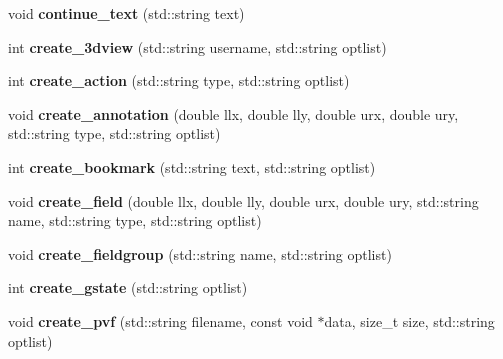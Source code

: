 \begin{DoxyCompactItemize}
\item 
\hypertarget{classPDFlib_a4ee3d13f4de6de4dd63f2430c2fb1ee2}{void {\bfseries continue\-\_\-text} (std\-::string text)}\label{classPDFlib_a4ee3d13f4de6de4dd63f2430c2fb1ee2}

\item 
\hypertarget{classPDFlib_ac3fb64cece3d7fbc0b5dd760e5ce490a}{int {\bfseries create\-\_\-3dview} (std\-::string username, std\-::string optlist)}\label{classPDFlib_ac3fb64cece3d7fbc0b5dd760e5ce490a}

\item 
\hypertarget{classPDFlib_abd882370ecf1a79ddf66c208817ab561}{int {\bfseries create\-\_\-action} (std\-::string type, std\-::string optlist)}\label{classPDFlib_abd882370ecf1a79ddf66c208817ab561}

\item 
\hypertarget{classPDFlib_af75e9080056e73d1aee1ad0277ac99eb}{void {\bfseries create\-\_\-annotation} (double llx, double lly, double urx, double ury, std\-::string type, std\-::string optlist)}\label{classPDFlib_af75e9080056e73d1aee1ad0277ac99eb}

\item 
\hypertarget{classPDFlib_a0ad6d073c261b0b69343fbc2aec77e61}{int {\bfseries create\-\_\-bookmark} (std\-::string text, std\-::string optlist)}\label{classPDFlib_a0ad6d073c261b0b69343fbc2aec77e61}

\item 
\hypertarget{classPDFlib_adf5520b414e9426b73d375cfbb142a20}{void {\bfseries create\-\_\-field} (double llx, double lly, double urx, double ury, std\-::string name, std\-::string type, std\-::string optlist)}\label{classPDFlib_adf5520b414e9426b73d375cfbb142a20}

\item 
\hypertarget{classPDFlib_a44fb65e6533101477d39fde1730c92e6}{void {\bfseries create\-\_\-fieldgroup} (std\-::string name, std\-::string optlist)}\label{classPDFlib_a44fb65e6533101477d39fde1730c92e6}

\item 
\hypertarget{classPDFlib_ae2eabf14be762f2999aedd15a1626234}{int {\bfseries create\-\_\-gstate} (std\-::string optlist)}\label{classPDFlib_ae2eabf14be762f2999aedd15a1626234}

\item 
\hypertarget{classPDFlib_a208ad8e80e2733820d54e6fb4f6313b8}{void {\bfseries create\-\_\-pvf} (std\-::string filename, const void $\ast$data, size\-\_\-t size, std\-::string optlist)}\label{classPDFlib_a208ad8e80e2733820d54e6fb4f6313b8}


\end{DoxyCompactItemize}

